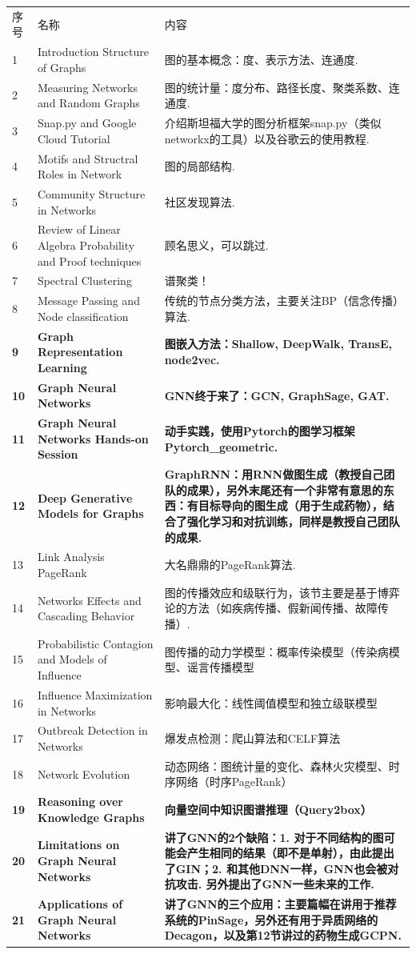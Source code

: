\documentclass[lang=cn,11pt,a4paper]{eleganttemplate}
\begin{document}
\begin{longtable}{p{0.8cm}p{5.5cm}p{9cm}}
序号 & 名称 & 内容 \\
1 & Introduction Structure of Graphs & 图的基本概念：度、表示方法、连通度. \\
2 & Measuring Networks and Random Graphs & 图的统计量：度分布、路径长度、聚类系数、连通度.  \\
3 & Snap.py and Google Cloud Tutorial & 介绍斯坦福大学的图分析框架snap.py（类似networkx的工具）以及谷歌云的使用教程. \\
4 & Motifs and Structral Roles in Network & 图的局部结构.  \\
5 & Community Structure in Networks & 社区发现算法.  \\
6 & Review of Linear Algebra Probability and Proof techniques & 顾名思义，可以跳过.  \\
7 & Spectral Clustering & 谱聚类！ \\
8 & Message Passing and Node classification & 传统的节点分类方法，主要关注BP（信念传播）算法. \\
\textbf{9} & \textbf{Graph Representation Learning} & \textbf{图嵌入方法：Shallow, DeepWalk, TransE, node2vec.} \\
\textbf{10} & \textbf{Graph Neural Networks} & \textbf{GNN终于来了：GCN, GraphSage, GAT.}  \\
\textbf{11} & \textbf{Graph Neural Networks Hands-on Session} & \textbf{动手实践，使用Pytorch的图学习框架Pytorch\_geometric.} \\
\textbf{12} & \textbf{Deep Generative Models for Graphs} & \textbf{GraphRNN：用RNN做图生成（教授自己团队的成果），另外末尾还有一个非常有意思的东西：有目标导向的图生成（用于生成药物），结合了强化学习和对抗训练，同样是教授自己团队的成果.} \\
13 & Link Analysis PageRank & 大名鼎鼎的PageRank算法.  \\
14 & Networks Effects and Cascading Behavior & 图的传播效应和级联行为，该节主要是基于博弈论的方法（如疾病传播、假新闻传播、故障传播）.  \\
15 & Probabilistic Contagion and Models of Influence & 图传播的动力学模型：概率传染模型（传染病模型、谣言传播模型 \\
16 & Influence Maximization in Networks & 影响最大化：线性阈值模型和独立级联模型 \\
17 & Outbreak Detection in Networks & 爆发点检测：爬山算法和CELF算法 \\
18 & Network Evolution & 动态网络：图统计量的变化、森林火灾模型、时序网络（时序PageRank） \\
\textbf{19} & \textbf{Reasoning over Knowledge Graphs} & \textbf{向量空间中知识图谱推理（Query2box）} \\
\textbf{20} & \textbf{Limitations on Graph Neural Networks} & \textbf{讲了GNN的2个缺陷：1. 对于不同结构的图可能会产生相同的结果（即不是单射），由此提出了GIN；2. 和其他DNN一样，GNN也会被对抗攻击. 另外提出了GNN一些未来的工作.}  \\
\textbf{21} & \textbf{Applications of Graph Neural Networks} & \textbf{讲了GNN的三个应用：主要篇幅在讲用于推荐系统的PinSage，另外还有用于异质网络的Decagon，以及第12节讲过的药物生成GCPN.} 
\end{longtable}
\end{document}
